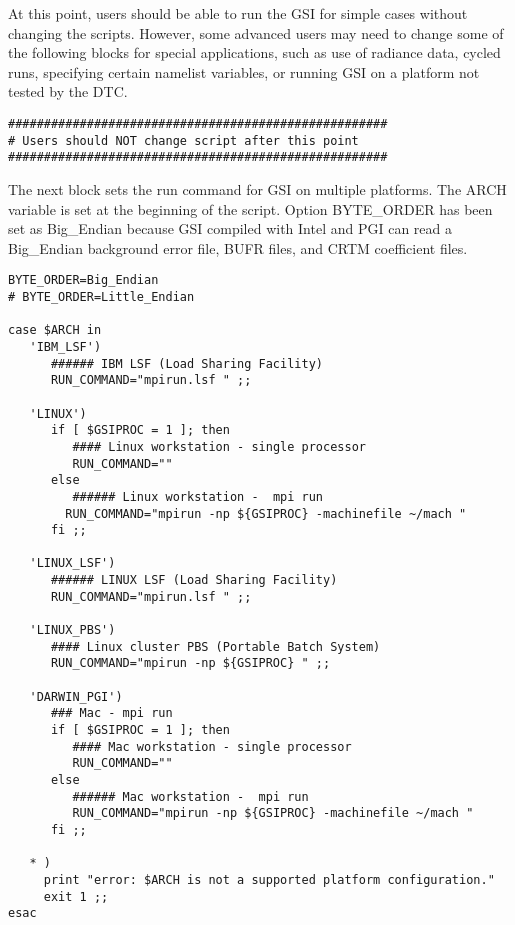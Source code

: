 At this point, users should be able to run the GSI for simple cases without changing the scripts. However, some advanced users may need to change some of the following blocks for special applications, such as use of radiance data, cycled runs, specifying certain namelist variables, or running GSI on a platform not tested by the DTC. 

\begin{footnotesize}
\begin{verbatim}
#####################################################
# Users should NOT change script after this point
#####################################################
\end{verbatim}
\end{footnotesize}

The next block sets the run command for GSI on multiple platforms. The ARCH variable is set at the beginning of the script. Option BYTE\_ORDER has been set as Big\_Endian because GSI compiled with Intel and PGI can read a Big\_Endian background error file, BUFR files, and CRTM coefficient files. 

\begin{footnotesize}
\begin{verbatim}
BYTE_ORDER=Big_Endian
# BYTE_ORDER=Little_Endian

case $ARCH in
   'IBM_LSF')
      ###### IBM LSF (Load Sharing Facility)
      RUN_COMMAND="mpirun.lsf " ;;

   'LINUX')
      if [ $GSIPROC = 1 ]; then
         #### Linux workstation - single processor
         RUN_COMMAND=""
      else
         ###### Linux workstation -  mpi run
        RUN_COMMAND="mpirun -np ${GSIPROC} -machinefile ~/mach "
      fi ;;

   'LINUX_LSF')
      ###### LINUX LSF (Load Sharing Facility)
      RUN_COMMAND="mpirun.lsf " ;;

   'LINUX_PBS')
      #### Linux cluster PBS (Portable Batch System)
      RUN_COMMAND="mpirun -np ${GSIPROC} " ;;

   'DARWIN_PGI')
      ### Mac - mpi run
      if [ $GSIPROC = 1 ]; then
         #### Mac workstation - single processor
         RUN_COMMAND=""
      else
         ###### Mac workstation -  mpi run
         RUN_COMMAND="mpirun -np ${GSIPROC} -machinefile ~/mach "
      fi ;;

   * )
     print "error: $ARCH is not a supported platform configuration."
     exit 1 ;;
esac
\end{verbatim}
\end{footnotesize}

